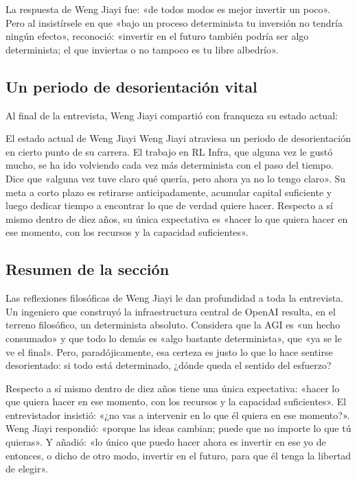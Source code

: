 \documentclass[a4paper]{article}
\begin{document}
La respuesta de Weng Jiayi fue: «de todos modos es mejor invertir un poco». Pero al insistírsele en que «bajo un proceso determinista tu inversión no tendría ningún efecto», reconoció: «invertir en el futuro también podría ser algo determinista; el que inviertas o no tampoco es tu libre albedrío».

\subsection{Un periodo de desorientación vital}

Al final de la entrevista, Weng Jiayi compartió con franqueza su estado actual:

\begin{knowledgebox}{El estado actual de Weng Jiayi}
Weng Jiayi atraviesa un periodo de desorientación en cierto punto de su carrera. El trabajo en RL Infra, que alguna vez le gustó mucho, se ha ido volviendo cada vez más determinista con el paso del tiempo. Dice que «alguna vez tuve claro qué quería, pero ahora ya no lo tengo claro». Su meta a corto plazo es retirarse anticipadamente, acumular capital suficiente y luego dedicar tiempo a encontrar lo que de verdad quiere hacer. Respecto a sí mismo dentro de diez años, su única expectativa es «hacer lo que quiera hacer en ese momento, con los recursos y la capacidad suficientes».
\end{knowledgebox}

\subsection{Resumen de la sección}

Las reflexiones filosóficas de Weng Jiayi le dan profundidad a toda la entrevista. Un ingeniero que construyó la infraestructura central de OpenAI resulta, en el terreno filosófico, un determinista absoluto. Considera que la AGI es «un hecho consumado» y que todo lo demás es «algo bastante determinista», que «ya se le ve el final». Pero, paradójicamente, esa certeza es justo lo que lo hace sentirse desorientado: si todo está determinado, ¿dónde queda el sentido del esfuerzo?

Respecto a sí mismo dentro de diez años tiene una única expectativa: «hacer lo que quiera hacer en ese momento, con los recursos y la capacidad suficientes». El entrevistador insistió: «¿no vas a intervenir en lo que él quiera en ese momento?». Weng Jiayi respondió: «porque las ideas cambian; puede que no importe lo que tú quieras». Y añadió: «lo único que puedo hacer ahora es invertir en ese yo de entonces, o dicho de otro modo, invertir en el futuro, para que él tenga la libertad de elegir».
\end{document}
